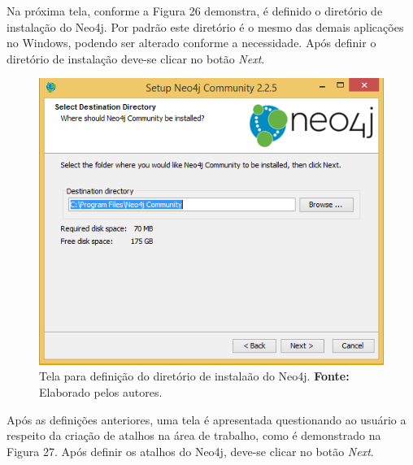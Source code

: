 \par Na próxima tela, conforme a Figura 26 demonstra, é definido o diretório de instalação do Neo4j. Por padrão este diretório é o mesmo das demais aplicações no Windows, podendo ser alterado conforme a necessidade. Após definir o diretório de instalação deve-se clicar no botão \textit{Next}.

\begin{figure}[h!]
	\centerline{\includegraphics[scale=0.4]{./imagens/neo4j-install-step3.png}}
	\caption[Tela para definição do diretório de instalaão do Neo4j]
	{Tela para definição do diretório de instalaão do Neo4j. \textbf{Fonte:} Elaborado pelos autores.}
	\label{fig:exemplo1}
\end{figure}

\par Após as definições anteriores, uma tela é apresentada questionando ao usuário a respeito da criação de atalhos na área de trabalho, como é demonstrado na Figura 27. Após definir os atalhos do Neo4j, deve-se clicar no botão \textit{Next}.

